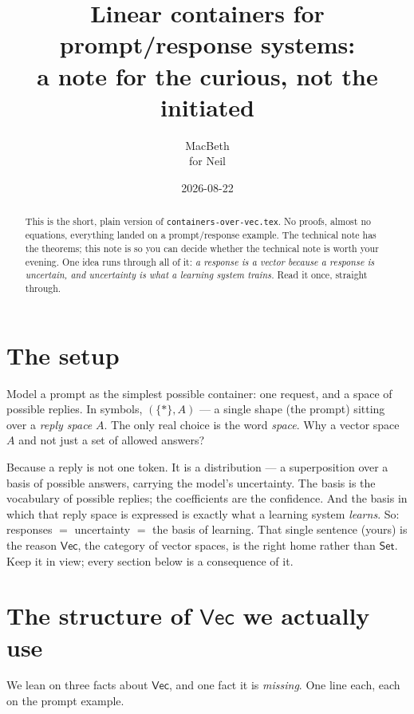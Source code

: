 \documentclass[11pt]{article}
\title{Linear containers for prompt/response systems:\\
a note for the curious, not the initiated}
\author{MacBeth \\ \small for Neil}
\date{2026-08-22}
\providecommand{\Vec}{}\renewcommand{\Vec}{\mathsf{Vec}}
\newcommand{\Set}{\mathsf{Set}}
\begin{document}
\maketitle

\begin{abstract}\noindent
This is the short, plain version of \texttt{containers-over-vec.tex}. No proofs, almost
no equations, everything landed on a prompt/response example. The technical note has the
theorems; this note is so you can decide whether the technical note is worth your evening.
One idea runs through all of it: \emph{a response is a vector because a response is
uncertain, and uncertainty is what a learning system trains.} Read it once, straight
through.
\end{abstract}

\section{The setup}

Model a prompt as the simplest possible container: one request, and a space of possible
replies. In symbols, $(\{*\}, A)$ --- a single shape (the prompt) sitting over a
\emph{reply space} $A$. The only real choice is the word \emph{space}. Why a vector space
$A$ and not just a set of allowed answers?

Because a reply is not one token. It is a distribution --- a superposition over a basis of
possible answers, carrying the model's uncertainty. The basis is the vocabulary of
possible replies; the coefficients are the confidence. And the basis in which that reply
space is expressed is exactly what a learning system \emph{learns}. So: responses $=$
uncertainty $=$ the basis of learning. That single sentence (yours) is the reason $\Vec$,
the category of vector spaces, is the right home rather than $\Set$. Keep it in view; every
section below is a consequence of it.

\section{The structure of $\Vec$ we actually use}

We lean on three facts about $\Vec$, and one fact it is \emph{missing}. One line each,
each on the prompt example.
\end{document}
